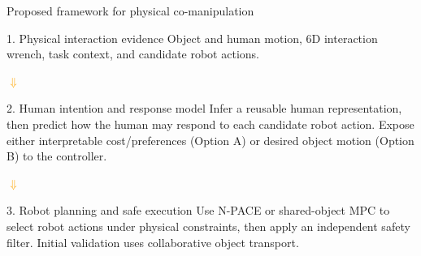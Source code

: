 \documentclass[aspectratio=169,11pt]{beamer}
\newcommand{\pinkcomment}[1]{\textcolor{pink}{\textbf{#1}}}
\begin{document}
\begin{frame}{Proposed framework for physical co-manipulation}
\begin{block}{1. Physical interaction evidence}
Object and human motion, 6D interaction wrench, task context, and candidate robot actions.
\end{block}
\centering\textcolor{orange}{\Large$\Downarrow$}\par
\begin{block}{2. Human intention and response model}
Infer a reusable human representation, then predict how the human may respond to each candidate robot action. Expose either interpretable cost/preferences (Option A) or desired object motion (Option B) to the controller.
\end{block}
\centering\textcolor{orange}{\Large$\Downarrow$}\par
\begin{block}{3. Robot planning and safe execution}
Use N-PACE or shared-object MPC to select robot actions under physical constraints, then apply an independent safety filter. Initial validation uses collaborative object transport.
\end{block}
\end{frame}
\end{document}
